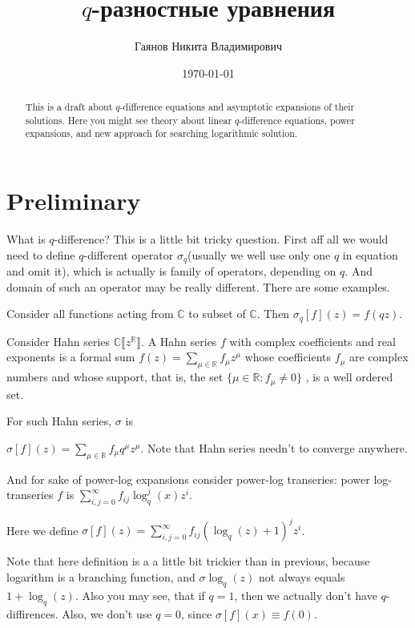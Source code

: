 \documentclass[a4paper, 14pt]{extarticle}
\author{Гаянов Никита Владимирович}
\title{$q$-разностные уравнения}
\date{\today}
\begin{document}
%
%

\maketitle

\begin{abstract}
    This is a draft about $q$-difference equations and asymptotic expansions of their solutions. Here you might see theory about linear $q$-difference equations, power expansions, and new approach for searching logarithmic solution.
\end{abstract}

\section{Preliminary}
What is $q$-difference? This is a little bit tricky question. First aff all we would need to define $q$-different operator $\sigma_q$(usually we well use only one $q$ in equation and omit it), which is actually is family of operators, depending on $q$. And domain of such an operator may be really different. There are some examples.

Consider all functions acting from $\mathbb{C}$ to subset of $\mathbb{C}$.
Then $\sigma_q [f](z) = f(qz)$.

Consider Hahn series $\mathbb{C} \llbracket z^{\mathbb{R}} \rrbracket$.
A Hahn series $f$ with complex coefficients and
real exponents is a formal sum $f(z) =\sum_{\mu \in \mathbb{R}} f_\mu z^\mu$ whose coefficients
$f_\mu$ are complex numbers and whose support, that is, the set
$\{ \mu \in \mathbb{R} : f_\mu \neq 0 \}$ ,
is a well ordered set.

For such Hahn series, $\sigma$ is

$\sigma[f](z) = \sum_{\mu \in \mathbb{R}} f_\mu q^\mu z^\mu$. Note that Hahn series needn't to converge anywhere.


And for sake of power-log expansions consider power-log transeries:
power log-transeries $f$ is $\sum_{i,j=0}^\infty f_{ij}\log_q^j(x) z^i$.

Here we define
$\sigma[f](z) = \sum_{i,j=0}^\infty f_{ij}(\log_q(z)+1)^j z^i$.

Note that here definition is a a little bit trickier than in previous, because logarithm is a branching function, and $\sigma\log_q(z)$ not always equals $1+\log_q(z)$.
Also you may see, that if $q=1$, then we actually don't have $q$-diffirences.
Also, we don't use $q=0$, since $\sigma[f](x) \equiv f(0)$.
\end{document}
